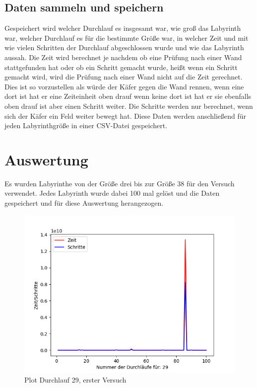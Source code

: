 \documentclass[12pt, a4paper, titlepage]{article}
\begin{document}
\subsection{Daten sammeln und speichern}

Gespeichert wird welcher Durchlauf es insgesamt war, wie groß das Labyrinth war, welcher Durchlauf es für die bestimmte Größe war, in welcher Zeit und mit wie vielen Schritten der Durchlauf abgeschlossen wurde und wie das Labyrinth aussah.
Die Zeit wird berechnet je nachdem ob eine Prüfung nach einer Wand stattgefunden hat oder ob ein Schritt gemacht wurde, heißt wenn ein Schritt gemacht wird, wird die Prüfung nach einer Wand nicht auf die Zeit gerechnet.
Dies ist so vorzustellen als würde der Käfer gegen die Wand rennen, wenn eine dort ist hat er eine Zeiteinheit oben drauf wenn keine dort ist hat er sie ebenfalls oben drauf ist aber einen Schritt weiter.
Die Schritte werden nur berechnet, wenn sich der Käfer ein Feld weiter bewegt hat.
Diese Daten werden anschließend für jeden Labyrinthgröße in einer CSV-Datei gespeichert.

\section{Auswertung}

Es wurden Labyrinthe von der Größe drei bis zur Größe 38 für den Versuch verwendet.
Jedes Labyrinth wurde dabei 100 mal gelöst und die Daten gespeichert und für diese Auswertung herangezogen.

\bigskip

\begin{figure}[h]
\centering
\includegraphics[scale=.5]{29.png}
\caption{Plot Durchlauf 29, erster Versuch}
\label{fig:Plot 29}
\end{figure}
\end{document}

